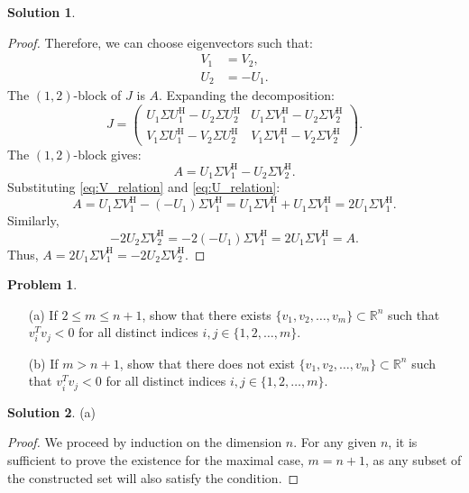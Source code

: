 \documentclass[12pt]{article}
\theoremstyle{definition}
\newtheorem*{solution}{\normalfont\textbf{Solution}}
\newtheorem*{Problem}{\noindent\textbf{Problem}}
\begin{document}
\begin{enumerate}[leftmargin=*]
\begin{solution}
\begin{proof}
                Therefore, we can choose eigenvectors such that:
                \begin{align}
                V_1 &= V_2, \label{eq:V_relation} \\
                U_2 &= -U_1. \label{eq:U_relation}
                \end{align}
                The \((1,2)\)-block of \(J\) is \(A\). Expanding the decomposition:
                \[
                J = \begin{pmatrix} U_1 \Sigma U_1^{\mathrm{H}} - U_2 \Sigma U_2^{\mathrm{H}} & U_1 \Sigma V_1^{\mathrm{H}} - U_2 \Sigma V_2^{\mathrm{H}} \\ V_1 \Sigma U_1^{\mathrm{H}} - V_2 \Sigma U_2^{\mathrm{H}} & V_1 \Sigma V_1^{\mathrm{H}} - V_2 \Sigma V_2^{\mathrm{H}} \end{pmatrix}.
                \]
                The \((1,2)\)-block gives:
                \[
                A = U_1 \Sigma V_1^{\mathrm{H}} - U_2 \Sigma V_2^{\mathrm{H}}.
                \]
                Substituting \eqref{eq:V_relation} and \eqref{eq:U_relation}:
                \[
                A = U_1 \Sigma V_1^{\mathrm{H}} - (-U_1) \Sigma V_1^{\mathrm{H}} = U_1 \Sigma V_1^{\mathrm{H}} + U_1 \Sigma V_1^{\mathrm{H}} = 2U_1 \Sigma V_1^{\mathrm{H}}.
                \]
                Similarly,
                \[
                -2U_2 \Sigma V_2^{\mathrm{H}} = -2(-U_1) \Sigma V_1^{\mathrm{H}} = 2U_1 \Sigma V_1^{\mathrm{H}} = A.
                \]
                Thus, \(A = 2U_1 \Sigma V_1^{\mathrm{H}} = -2U_2 \Sigma V_2^{\mathrm{H}}\).

            \end{proof}
    \end{solution}
        
    \item \begin{Problem}
            \begin{enumerate}
                \item[(a)] If \( 2 \leq m \leq n + 1 \), show that there exists \( \{ v_1, v_2, \ldots, v_m \} \subset \mathbb{R}^n \) such that \( v_i^T v_j < 0 \) for all distinct indices \( i, j \in \{ 1, 2, \ldots, m \} \).
                \item[(b)] If \( m > n + 1 \), show that there does not exist \( \{ v_1, v_2, \ldots, v_m \} \subset \mathbb{R}^n \) such that \( v_i^T v_j < 0 \) for all distinct indices \( i, j \in \{ 1, 2, \ldots, m \} \).
            \end{enumerate}
        \end{Problem}
        \begin{solution}
        \item[(a)]
            \begin{proof}
                We proceed by induction on the dimension \(n\). For any given \(n\), it is sufficient to prove the existence for the maximal case, \(m = n+1\), as any subset of the constructed set will also satisfy the condition.


\end{proof}
\end{solution}
\end{enumerate}
\end{document}

